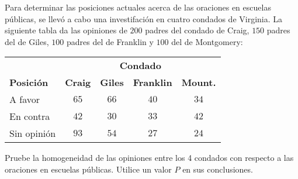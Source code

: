 \begin{enunciado}
 Para determinar las posiciones actuales acerca de las oraciones en escuelas p\'ublicas, se llev\'o a cabo una investifaci\'on en cuatro condados de Virginia.
 La siguiente tabla da las opiniones de $200$ padres del condado de Craig,
 $150$ padres del de Giles, $100$ padres del de Franklin
 y $100$ del de Montgomery:
 \begin{center}
  \begin{tabular}{lcccc}
   & \multicolumn{4}{c}{\textbf{Condado}} \\
   \textbf{Posici\'on} & \textbf{Craig} & \textbf{Giles} &
   \textbf{Franklin} & \textbf{Mount.} \\
   \hline 
   A favor & $65$ & $66$ & $40$ & $34$ \\
   En contra & $42$ & $30$ & $33$ & $42$ \\
   Sin opini\'on & $93$ & $54$ & $27$ & $24$
  \end{tabular}
 \end{center}
 Pruebe la homogeneidad de las opiniones entre los 4 condados con respecto a las oraciones en escuelas p\'ublicas. Utilice un valor $P$ en sus conclusiones.
\end{enunciado}

